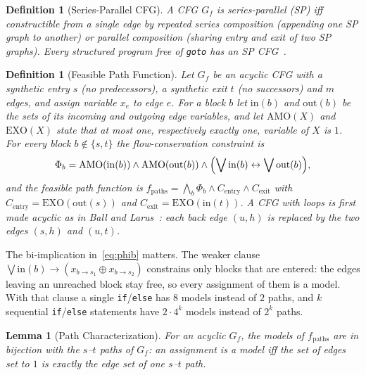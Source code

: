 \documentclass[journal,10pt,twoside]{IEEEtran}
\newtheorem{lemma}[theorem]{Lemma}
\newtheorem{definition}[theorem]{Definition}
\begin{document}
\begin{definition}[Series-Parallel CFG]\label{def:sp}
A CFG $G_f$ is \emph{series-parallel} (SP) iff constructible
from a single edge by repeated \emph{series composition}
(appending one SP graph to another) or \emph{parallel
composition} (sharing entry and exit of two SP graphs).
Every structured program free of \texttt{goto} has an SP
CFG~\cite{valdes79}.
\end{definition}

\begin{definition}[Feasible Path Function]\label{def:pathfunc}
Let $G_f$ be an acyclic CFG with a synthetic entry $s$ (no
predecessors), a synthetic exit $t$ (no successors) and $m$
edges, and assign variable $x_e$ to edge $e$.  For a block
$b$ let $\mathrm{in}(b)$ and $\mathrm{out}(b)$ be the sets of
its incoming and outgoing edge variables, and let
$\mathrm{AMO}(X)$ and $\mathrm{EXO}(X)$ state that at most one,
respectively exactly one, variable of $X$ is $1$.  For every
block $b \notin \{s,t\}$ the \emph{flow-conservation
constraint} is
\begin{equation}\label{eq:phib}
  \Phi_b = \mathrm{AMO}(\mathrm{in}(b)) \wedge
  \mathrm{AMO}(\mathrm{out}(b)) \wedge
  \Bigl(\bigvee \mathrm{in}(b) \leftrightarrow
        \bigvee \mathrm{out}(b)\Bigr),
\end{equation}
and the \emph{feasible path function} is
$f_{\mathrm{paths}} = \bigwedge_b \Phi_b \wedge
C_{\mathrm{entry}} \wedge C_{\mathrm{exit}}$ with
$C_{\mathrm{entry}} = \mathrm{EXO}(\mathrm{out}(s))$ and
$C_{\mathrm{exit}} = \mathrm{EXO}(\mathrm{in}(t))$.
A CFG with loops is first made acyclic as in Ball and
Larus~\cite{balllarus96}: each back edge $(u,h)$ is replaced
by the two edges $(s,h)$ and $(u,t)$.
\end{definition}

The bi-implication in~\eqref{eq:phib} matters.  The weaker
clause $\bigvee\mathrm{in}(b) \to (x_{b\to s_1} \oplus
x_{b\to s_2})$ constrains only blocks that are entered: the
edges leaving an unreached block stay free, so every
assignment of them is a model.  With that clause a single
\texttt{if}/\texttt{else} has $8$ models instead of $2$
paths, and $k$ sequential \texttt{if}/\texttt{else}
statements have $2\cdot 4^k$ models instead of $2^k$ paths.

\begin{lemma}[Path Characterization]\label{lem:pathchar}
For an acyclic $G_f$, the models of $f_{\mathrm{paths}}$ are
in bijection with the $s$--$t$ paths of $G_f$: an assignment
is a model iff the set of edges set to $1$ is exactly the edge
set of one $s$--$t$ path.
\end{lemma}
\end{document}
